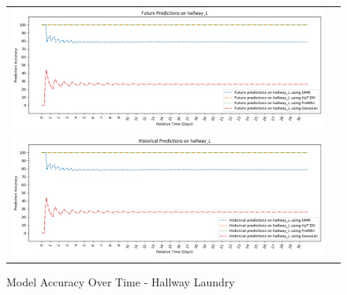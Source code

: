 \begin{center}
\begin{figure}[!Hp]
  \begin{tabular}{cc}
    {\includegraphics[width = 6in]{images/results/Future_Predictions_on_hallway_L.png}} \\
    {\includegraphics[width = 6in]{images/results/Historical_Predictions_on_hallway_L.png}} \\
  \end{tabular}
  \caption{Model Accuracy Over Time - Hallway Laundry}
\end{figure}


\end{center}
